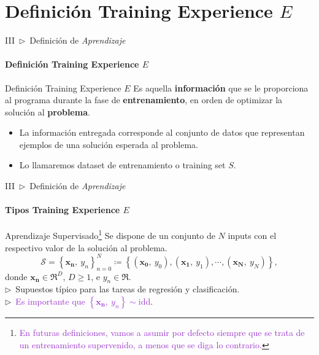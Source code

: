 \documentclass[xcolor=dvipsnames]{beamer}
\begin{document}
    \section{Definición Training Experience \( E \)}
    \begin{frame}{III~$\rhd$~Definición de \textit{Aprendizaje}}
    \framesubtitle{Definición Training Experience \( E \)}
        \begin{block}{Definición Training Experience \( E \)}
        Es aquella \textbf{información} que se le proporciona al programa durante la fase de \textbf{entrenamiento}, en orden de optimizar la solución al \textbf{problema}.
        \end{block}
        \vspace{5mm}
        \begin{itemize}
            \item La información entregada corresponde al conjunto de datos que representan ejemplos de una solución esperada al problema.
            \item Lo llamaremos dataset de entrenamiento o training set $S$.
        \end{itemize}
    \end{frame}
    
    \begin{frame}{III~$\rhd$~Definición de \textit{Aprendizaje}}
    \framesubtitle{Tipos Training Experience \( E \)}
        \begin{block}{Aprendizaje Supervisado}\footnote{\textcolor{DarkOrchid}{En futuras definiciones, vamos a asumir por defecto siempre que se trata de un entrenamiento supervenido, a menos que se diga lo contrario.}}
        Se dispone de un conjunto de $N$ inputs con el respectivo valor de la solución al problema.
        \begin{equation*}
            \mathcal{S}=\left\{\mathbf{x_{n}},~y_{n}\right\}^{N}_{n=0}\coloneq \left\{ \left(\mathbf{x_{0}},~y_{0}\right), \left(\mathbf{x_{1}},~y_{1}\right), \cdots, \left(\mathbf{x_{N}},~y_{N}\right) \right\},
        \end{equation*}
        donde $\mathbf{x_{n}}\in\Re^{D}$, $D\geq1$, e $y_{n}\in\Re$.\\
        \vspace{2mm}
        $\rhd$~Supuestos típico para las tareas de regresión y clasificación.\\
        $\rhd$~\textcolor{DarkOrchid}{Es importante que $\left\{\mathbf{x_{n}},~y_{n}\right\}\sim\text{idd}$}.
        \end{block}
    \end{frame}
\end{document}

